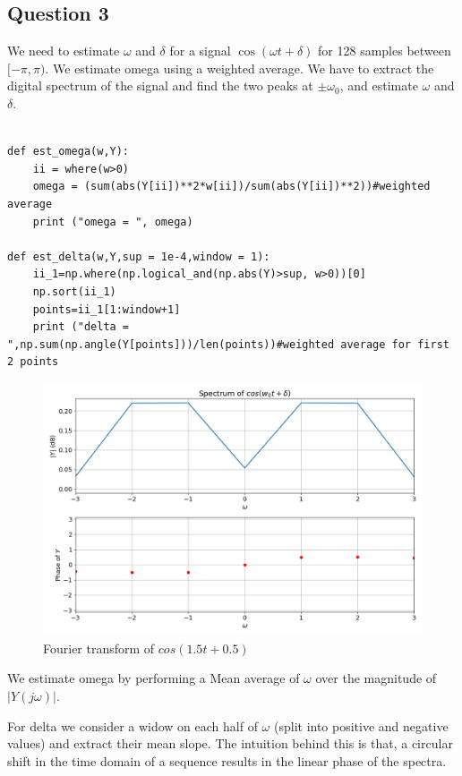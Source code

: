 \documentclass{article}
\begin{document}
\subsection{Question 3}
We need to estimate $\omega$ and $\delta$ for a signal $\cos(\omega t + \delta)$ for 128 samples between $[-\pi,\pi)$. 
We estimate omega using a weighted average. We have to extract the digital spectrum of the signal and find 
the two peaks at $\pm\omega_0$, and estimate $\omega$ and $\delta$.

\begin{lstlisting}

def est_omega(w,Y):
    ii = where(w>0)
    omega = (sum(abs(Y[ii])**2*w[ii])/sum(abs(Y[ii])**2))#weighted average
    print ("omega = ", omega)

def est_delta(w,Y,sup = 1e-4,window = 1):
    ii_1=np.where(np.logical_and(np.abs(Y)>sup, w>0))[0]
    np.sort(ii_1)
    points=ii_1[1:window+1]
    print ("delta = ",np.sum(np.angle(Y[points]))/len(points))#weighted average for first 2 points

\end{lstlisting}

\begin{figure}[!tbh]
\centering
\includegraphics[scale=0.4]{plots/normal_cosine.png}
\caption{Fourier transform of $cos(1.5t+0.5)$}
\label{fig:10}
\end{figure}

\noindent
We estimate omega by performing a Mean average of $\omega$ over the magnitude of $|Y(j\omega)|$.

\noindent
For delta we consider a widow on each half of $\omega$ (split into positive and negative values) and extract their mean slope. 
The intuition behind this is that, a circular shift in the time domain of a sequence results in the linear phase of the spectra.
\end{document}
